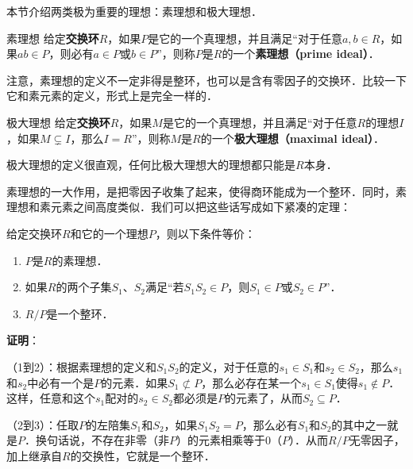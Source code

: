 

本节介绍两类极为重要的理想：素理想和极大理想．





\begin{definition}{素理想}
给定\textbf{交换环}$R$，如果$P$是它的一个真理想，并且满足“对于任意$a, b\in R$，如果$ab\in P$，则必有$a\in P$或$b\in P$”，则称$P$是$R$的一个\textbf{素理想（prime ideal）}．
\end{definition}

注意，素理想的定义不一定非得是整环，也可以是含有零因子的交换环．比较一下它和素元素的定义，形式上是完全一样的．

\begin{definition}{极大理想}
给定\textbf{交换环}$R$，如果$M$是它的一个真理想，并且满足“对于任意$R$的理想$I$，如果$M\subsetneq I$，那么$I=R$”，则称$M$是$R$的一个\textbf{极大理想（maximal ideal）}．
\end{definition}

极大理想的定义很直观，任何比极大理想大的理想都只能是$R$本身．

素理想的一大作用，是把零因子收集了起来，使得商环能成为一个整环．同时，素理想和素元素之间高度类似．我们可以把这些话写成如下紧凑的定理：

\begin{theorem}{}\label{Ideals_the1}
给定交换环$R$和它的一个理想$P$，则以下条件等价：
\begin{enumerate}
\item $P$是$R$的素理想．
\item 如果$R$的两个子集$S_1$、$S_2$满足“若$S_1S_2\in P$，则$S_1\in P$或$S_2\in P$”．
\item $R/P$是一个整环．
\end{enumerate}
\end{theorem}

\textbf{证明}：

（1到2）：根据素理想的定义和$S_1S_2$的定义，对于任意的$s_1\in S_1$和$s_2\in S_2$，那么$s_1$和$s_2$中必有一个是$P$的元素．如果$S_1\not\subset P$，那么必存在某一个$s_1\in S_1$使得$s_1\not\in P$．这样，任意和这个$s_1$配对的$s_2\in S_2$都必须是$P$的元素了，从而$S_2\subseteq P$．

（2到3）：任取$P$的左陪集$S_1$和$S_2$，如果$S_1S_2=P$，那么必有$S_1$和$S_2$的其中之一就是$P$．换句话说，不存在非零（非$P$）的元素相乘等于$0$（$P$）．从而$R/P$无零因子，加上继承自$R$的交换性，它就是一个整环．

